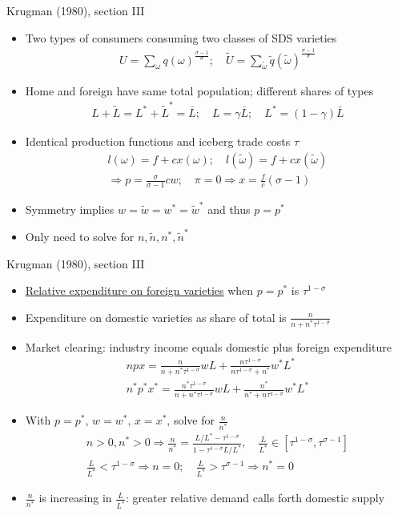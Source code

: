 \documentclass[10pt,notes=hide]{beamer}
\begin{document}
\begin{frame}{Krugman (1980), section III}
\begin{itemize}
	\item Two types of consumers consuming two classes of SDS varieties
	\begin{align*}U = \sum_{\omega} q(\omega)^{\frac{\sigma-1}{\sigma}} ; \quad \tilde{U} = \sum_{\tilde{\omega}} \tilde{q}(\tilde{\omega})^{\frac{\sigma-1}{\sigma}} \end{align*}
	\item Home and foreign have same total population; different shares of types
	\begin{align*}L + \tilde{L} = L^* + \tilde{L}^{*} = \bar{L} ; \quad L = \gamma \bar{L} ; \quad L^* = (1-\gamma)\bar{L}  \end{align*}
	\item Identical production functions and iceberg trade costs $\tau$
	\begin{align*} l(\omega) = f + c x(\omega) ; \quad l(\tilde{\omega}) = f + c x(\tilde{\omega}) \\
	\Rightarrow p = \frac{\sigma}{\sigma-1} c w ; \quad \pi=0\Rightarrow x = \frac{f}{c}\left(\sigma-1\right)
	\end{align*}
	\item Symmetry implies $w = \tilde{w} = w^* = \tilde{w}^*$ and thus $p=p^*$
	\item Only need to solve for $n, \tilde{n}, n^*, \tilde{n}^{*}$
\end{itemize}
\end{frame}
\begin{frame}{Krugman (1980), section III}
\begin{itemize}
	\item \href{http://www.columbia.edu/~jid2106/td/dixitstiglitzbasics.pdf}{Relative expenditure on foreign varieties} when $p=p^*$ is $\tau^{1-\sigma}$
	\item Expenditure on domestic varieties as share of total is $\frac{n}{n + n^*\tau^{1-\sigma}}$
	\item Market clearing: industry income equals domestic plus foreign expenditure
	\begin{align*}
	npx = \frac{n}{n + n^*\tau^{1-\sigma}} w L + \frac{n\tau^{1-\sigma}}{n\tau^{1-\sigma} + n^*} w^* L^* \\
	n^*p^*x^* = \frac{n^*\tau^{1-\sigma}}{n + n^*\tau^{1-\sigma}} w L + \frac{n^*}{n^* + n\tau^{1-\sigma}} w^* L^*
	\end{align*}
	\item With $p=p^*$, $w=w^*$, $x=x^*$, solve for $\frac{n}{n^*}$
	\begin{align*}
	n>0,n^*>0 \Rightarrow \frac{n}{n^*} = \frac{L/L^* - \tau^{1-\sigma}}{1 - \tau^{1-\sigma}L/L^*}, \quad \frac{L}{L^*} \in [\tau^{1-\sigma},\tau^{\sigma-1}] \\
	 \frac{L}{L^*} < \tau^{1-\sigma} \Rightarrow n = 0 ; \quad \frac{L}{L^*} > \tau^{\sigma-1} \Rightarrow n^* = 0 
	\end{align*}
	\item $\frac{n}{n^*}$ is increasing in $\frac{L}{L^*}$: greater relative demand calls forth domestic supply
\end{itemize}
\end{frame}
\end{document}

